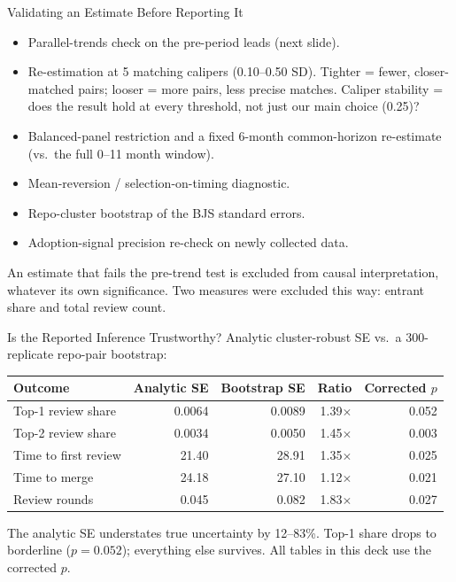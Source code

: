 \begin{frame}{Validating an Estimate Before Reporting It}
\begin{itemize}
  \item Parallel-trends check on the pre-period leads (next slide).
  \item Re-estimation at 5 matching calipers (0.10--0.50 SD). Tighter =
        fewer, closer-matched pairs; looser = more pairs, less precise
        matches. Caliper stability = does the result hold at every
        threshold, not just our main choice (0.25)?
  \item Balanced-panel restriction and a fixed 6-month common-horizon
        re-estimate (vs.\ the full 0--11 month window).
  \item Mean-reversion / selection-on-timing diagnostic.
  \item Repo-cluster bootstrap of the BJS standard errors.
  \item Adoption-signal precision re-check on newly collected data.
\end{itemize}
\vspace{0.5em}
An estimate that fails the pre-trend test is excluded from causal
interpretation, whatever its own significance. Two measures were
excluded this way: entrant share and total review count.
\end{frame}

\begin{frame}{Is the Reported Inference Trustworthy?}
Analytic cluster-robust SE vs.\ a 300-replicate repo-pair bootstrap:
\begin{table}
\centering
\scriptsize
\begin{tabular}{lrrrr}
\toprule
Outcome & Analytic SE & Bootstrap SE & Ratio & Corrected $p$ \\
\midrule
Top-1 review share     & 0.0064 & 0.0089 & 1.39$\times$ & 0.052 \\
Top-2 review share     & 0.0034 & 0.0050 & 1.45$\times$ & 0.003 \\
Time to first review   & 21.40  & 28.91  & 1.35$\times$ & 0.025 \\
Time to merge          & 24.18  & 27.10  & 1.12$\times$ & 0.021 \\
Review rounds          & 0.045  & 0.082  & 1.83$\times$ & 0.027 \\
\bottomrule
\end{tabular}
\end{table}
The analytic SE understates true uncertainty by 12--83\%. Top-1 share
drops to borderline ($p=0.052$); everything else survives. All tables
in this deck use the corrected $p$.
\end{frame}

